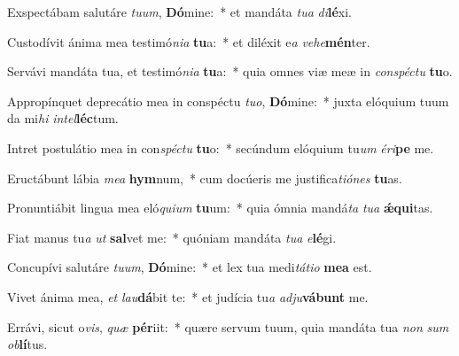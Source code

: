 \item Exspectábam salutáre \textit{tu}\textit{um}, \textbf{Dó}mine:~* et mandáta \textit{tu}\textit{a} \textit{di}\textbf{lé}xi.
\item Custodívit ánima mea testimó\textit{ni}\textit{a} \textbf{tu}a:~* et diléxit e\textit{a} \textit{ve}\textit{he}\textbf{mén}ter.
\item Servávi mandáta tua, et testimó\textit{ni}\textit{a} \textbf{tu}a:~* quia omnes viæ meæ in \textit{con}\textit{spéc}\textit{tu} \textbf{tu}o.
\item Appropínquet deprecátio mea in conspéctu \textit{tu}\textit{o}, \textbf{Dó}mine:~* juxta elóquium tuum da mi\textit{hi} \textit{in}\textit{tel}\textbf{léc}tum.
\item Intret postulátio mea in con\textit{spéc}\textit{tu} \textbf{tu}o:~* secúndum elóquium tu\textit{um} \textit{é}\textit{ri}\textbf{pe} me.
\item Eructábunt lábia \textit{me}\textit{a} \textbf{hym}num,~* cum docúeris me justifica\textit{ti}\textit{ó}\textit{nes} \textbf{tu}as.
\item Pronuntiábit lingua mea eló\textit{qui}\textit{um} \textbf{tu}um:~* quia ómnia mandá\textit{ta} \textit{tu}\textit{a} \textbf{ǽ}\textbf{qui}tas.
\item Fiat manus tu\textit{a} \textit{ut} \textbf{sal}vet me:~* quóniam mandáta \textit{tu}\textit{a} \textit{e}\textbf{lé}gi.
\item Concupívi salutáre \textit{tu}\textit{um}, \textbf{Dó}mine:~* et lex tua medi\textit{tá}\textit{ti}\textit{o} \textbf{me}\textbf{a} est.
\item Vivet ánima mea, \textit{et} \textit{lau}\textbf{dá}bit te:~* et judícia tu\textit{a} \textit{ad}\textit{ju}\textbf{vá}\textbf{bunt} me.
\item Errávi, sicut o\textit{vis}, \textit{quæ} \textbf{pér}iit:~* quære servum tuum, quia mandáta tua \textit{non} \textit{sum} \textit{ob}\textbf{lí}tus.
